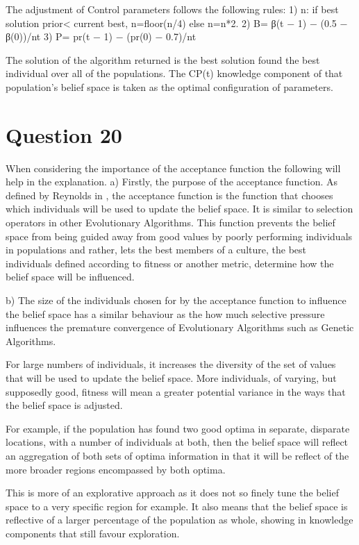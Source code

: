 \documentclass[12pt]{article}
\begin{document}
The adjustment of Control parameters follows the following rules:
	1) n: if best solution prior< current best, n=floor(n/4) else n=n*2.
	2) B= β(t − 1) − (0.5 − β(0))/nt \cite{chang_xu_2000}
	3) P= pr(t − 1) − (pr(0) − 0.7)/nt \cite{chang_xu_2000}

The solution of the algorithm returned is the best solution found the best individual over all of the populations. The CP(t) knowledge component of that population's belief space is taken as the optimal configuration of parameters.
\section{Question 20}
When considering the importance of the acceptance function the following will help in the explanation.
	a) Firstly, the purpose of the acceptance function.
	As defined by Reynolds in \cite{reynolds:1994:ica}, the acceptance function is the function that chooses which individuals will be used to update the belief space. It is similar to selection operators in other Evolutionary Algorithms. This function prevents the belief space from being guided away from good values by poorly performing individuals in populations and rather, lets the best members of a culture, the best individuals defined according to fitness or another metric, determine how the belief space will be influenced.

	b) The size of the individuals chosen for by the acceptance function to influence the belief space has a similar behaviour as the how much selective pressure influences the premature convergence of Evolutionary Algorithms such as Genetic Algorithms.

	For large numbers of individuals, it increases the diversity of the set of values that will be used to update the belief space. More individuals, of varying, but supposedly good, fitness will mean a greater potential variance in the ways that the belief space is adjusted.

	For example, if the population has found two good optima in separate, disparate locations, with a number of individuals at both, then the belief space will reflect an aggregation of both sets of optima information in that it will be reflect of the more broader regions encompassed by both optima.

	This is more of an explorative approach as it does not so finely tune the belief space to a very specific region for example. It also means that the belief space is reflective of a larger percentage of the population as whole, showing in knowledge components that still favour exploration.
\end{document}
